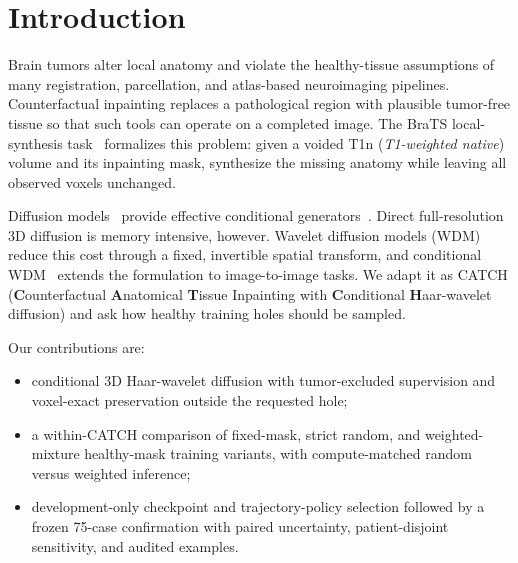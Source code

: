 \section{Introduction}
\label{sec:introduction}

Brain tumors alter local anatomy and violate the healthy-tissue assumptions of many
registration, parcellation, and atlas-based neuroimaging pipelines. Counterfactual
inpainting replaces a pathological region with plausible tumor-free tissue so that
such tools can operate on a completed image. The BraTS local-synthesis
task~\cite{kofler2023inpainting} formalizes this problem: given a voided T1n
(\emph{T1-weighted native}) volume and its inpainting mask, synthesize the missing
anatomy while leaving all observed voxels unchanged.

Diffusion models~\cite{ho2020ddpm} provide effective conditional
generators~\cite{lugmayr2022repaint,saharia2022palette}. Direct full-resolution 3D
diffusion is memory intensive, however. Wavelet diffusion models
(WDM)~\cite{friedrich2024wdm} reduce this cost through a fixed, invertible spatial
transform, and conditional WDM~\cite{friedrich2024cwdm} extends the formulation to
image-to-image tasks. We adapt it as CATCH (\textbf{C}ounterfactual
\textbf{A}natomical \textbf{T}issue Inpainting with \textbf{C}onditional
\textbf{H}aar-wavelet diffusion) and ask how healthy training holes should be
sampled.

Our contributions are:
\begin{itemize}
  \item conditional 3D Haar-wavelet diffusion with tumor-excluded supervision and
  voxel-exact preservation outside the requested hole;
  \item a within-CATCH comparison of fixed-mask, strict random, and
  weighted-mixture healthy-mask training variants, with compute-matched random
  versus weighted inference;
  \item development-only checkpoint and trajectory-policy selection followed by a
  frozen 75-case confirmation with paired uncertainty, patient-disjoint
  sensitivity, and audited examples.
\end{itemize}
